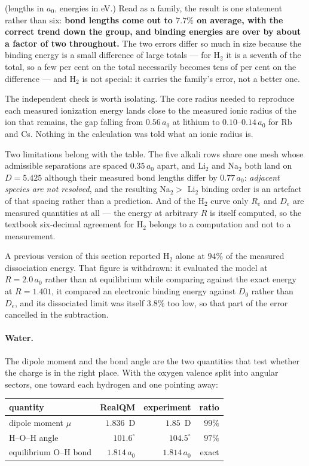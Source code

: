 \documentclass[11pt]{article}
\begin{document}
\noindent (lengths in $a_0$, energies in eV.) Read as a family, the result is one statement rather
than six: \textbf{bond lengths come out to $7.7\%$ on average, with the correct trend down the
group, and binding energies are over by about a factor of two throughout.} The two errors differ so much
in size because the binding energy is a small difference of large totals --- for H$_2$ it is a
seventh of the total, so a few per cent on the total necessarily becomes tens of per cent on the
difference --- and H$_2$ is not special: it carries the family's error, not a better one.

The independent check is worth isolating. The core radius needed to reproduce each measured
ionization energy lands close to the measured ionic radius of the ion that remains, the gap
falling from $0.56\,a_0$ at lithium to $0.10$--$0.14\,a_0$ for Rb and Cs. Nothing in the
calculation was told what an ionic radius is.

Two limitations belong with the table. The five alkali rows share one mesh whose admissible
separations are spaced $0.35\,a_0$ apart, and Li$_2$ and Na$_2$ both land on $D = 5.425$ although
their measured bond lengths differ by $0.77\,a_0$: \emph{adjacent species are not resolved}, and
the resulting Na$_2 >$ Li$_2$ binding order is an artefact of that spacing rather than a
prediction. And of the H$_2$ curve only $R_e$ and $D_e$ are measured quantities at all --- the
energy at arbitrary $R$ is itself computed, so the textbook six-decimal agreement for H$_2$ belongs
to a computation and not to a measurement.

A previous version of this section reported H$_2$ alone at $94\%$ of the measured dissociation
energy. That figure is withdrawn: it evaluated the model at $R = 2.0\,a_0$ rather than at
equilibrium while comparing against the exact energy at $R = 1.401$, it compared an electronic
binding energy against $D_0$ rather than $D_e$, and its dissociated limit was itself $3.8\%$ too
low, so that part of the error cancelled in the subtraction.

\paragraph{Water.} The dipole moment and the bond angle are the two quantities that test whether
the charge is in the right place. With the oxygen valence split into angular sectors, one toward
each hydrogen and one pointing away:

\begin{center}
\begin{tabular}{lrrr}
\toprule
quantity & RealQM & experiment & ratio \\
\midrule
dipole moment $\mu$      & $1.836$~D  & $1.85$~D  & $99\%$ \\
H--O--H angle            & $101.6^\circ$ & $104.5^\circ$ & $97\%$ \\
equilibrium O--H bond    & $1.814\,a_0$ & $1.814\,a_0$ & exact \\
\bottomrule
\end{tabular}
\end{center}
\end{document}
